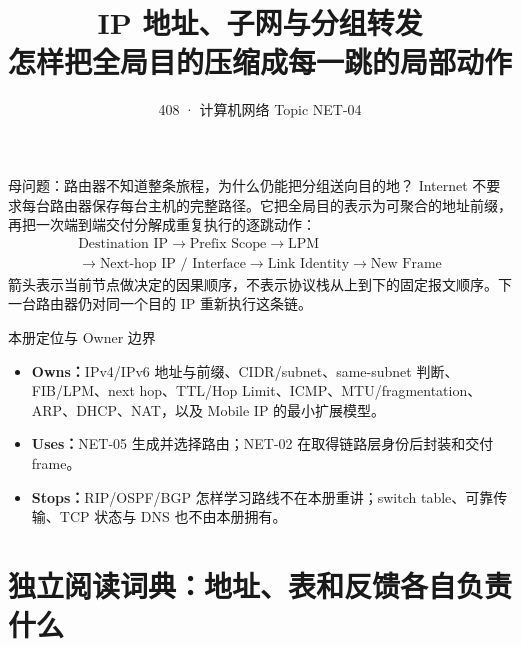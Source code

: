 \documentclass[11pt,a4paper]{ctexart}
\title{\vspace{-1.1cm}\textbf{IP 地址、子网与分组转发}\\[0.4em]\large 怎样把全局目的压缩成每一跳的局部动作}
\author{408 · 计算机网络 Topic NET-04}
\date{}
\newcommand{\kw}[1]{\textbf{\color{deep}#1}}
\begin{document}
\maketitle

\begin{corebox}{母问题：路由器不知道整条旅程，为什么仍能把分组送向目的地？}
Internet 不要求每台路由器保存每台主机的完整路径。它把全局目的表示为可聚合的地址前缀，再把一次端到端交付分解成重复执行的逐跳动作：
\[
\boxed{\begin{gathered}
\text{Destination IP}\to \text{Prefix Scope}\to \text{LPM}\\
\to \text{Next-hop IP / Interface}\to \text{Link Identity}\to \text{New Frame}
\end{gathered}}
\]
箭头表示当前节点做决定的因果顺序，不表示协议栈从上到下的固定报文顺序。下一台路由器仍对同一个目的 IP 重新执行这条链。
\end{corebox}

\begin{methodbox}{本册定位与 Owner 边界}
\begin{itemize}
  \item \kw{Owns：}IPv4/IPv6 地址与前缀、CIDR/subnet、same-subnet 判断、FIB/LPM、next hop、TTL/Hop Limit、ICMP、MTU/fragmentation、ARP、DHCP、NAT，以及 Mobile IP 的最小扩展模型。
  \item \kw{Uses：}NET-05 生成并选择路由；NET-02 在取得链路层身份后封装和交付 frame。
  \item \kw{Stops：}RIP/OSPF/BGP 怎样学习路线不在本册重讲；switch table、可靠传输、TCP 状态与 DNS 也不由本册拥有。
\end{itemize}
\end{methodbox}

\section{独立阅读词典：地址、表和反馈各自负责什么}
\end{document}
